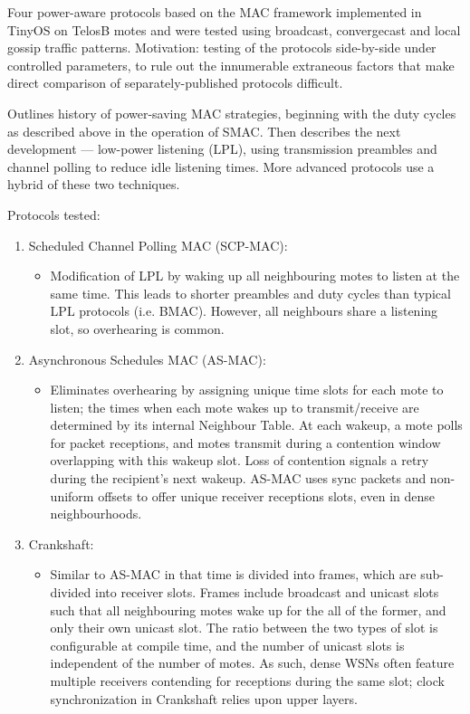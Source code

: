 Four power-aware protocols based on the MAC framework implemented in TinyOS on TelosB motes and were tested using broadcast, convergecast and local gossip traffic patterns. Motivation: testing of the protocols side-by-side under controlled parameters, to rule out the innumerable extraneous factors that make direct comparison of separately-published protocols difficult.

Outlines history of power-saving MAC strategies, beginning with the duty cycles as described above in the operation of SMAC. Then describes the next development --- low-power listening (LPL), using transmission preambles and channel polling to reduce idle listening times. More advanced protocols use a hybrid of these two techniques.

Protocols tested:
\begin{enumerate}
	\item Scheduled Channel Polling MAC (SCP-MAC):
	\begin{itemize}
		\item Modification of LPL by waking up all neighbouring motes to listen at the same time. This leads to shorter preambles and duty cycles than typical LPL protocols (i.e. BMAC). However, all neighbours share a listening slot, so overhearing is common.
	\end{itemize}
	
	\item Asynchronous Schedules MAC (AS-MAC):
	\begin{itemize}
		\item Eliminates overhearing by assigning unique time slots for each mote to listen; the times when each mote wakes up to transmit/receive are determined by its internal Neighbour Table. At each wakeup, a mote polls for packet receptions, and motes transmit during a contention window overlapping with this wakeup slot. Loss of contention signals a retry during the recipient's next wakeup. AS-MAC uses sync packets and non-uniform offsets to offer unique receiver receptions slots, even in dense neighbourhoods.
	\end{itemize}
	
	\item Crankshaft:
	\begin{itemize}
		\item Similar to AS-MAC in that time is divided into frames, which are sub-divided into receiver slots. Frames include broadcast and unicast slots such that all neighbouring motes wake up for the all of the former, and only their own unicast slot. The ratio between the two types of slot is configurable at compile time, and the number of unicast slots is independent of the number of motes. As such, dense WSNs often feature multiple receivers contending for receptions during the same slot; clock synchronization in Crankshaft relies upon upper layers.
	\end{itemize}
	

\end{enumerate}
